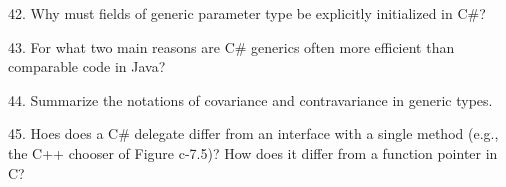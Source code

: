 42. Why must fields of generic parameter type be explicitly initialized in C$\#$?

\filbreak
\vskip 1cm

43. For what two main reasons are C$\#$ generics often more efficient than comparable code in Java?

\filbreak
\vskip 1cm

44. Summarize the notations of covariance and contravariance in generic types.

\filbreak
\vskip 1cm

45. Hoes does a C$\#$ delegate differ from an interface with a single method (e.g., the C++ chooser of Figure c-7.5)? How does it differ from a function pointer in C?

\filbreak
\vfill\eject
\bye
